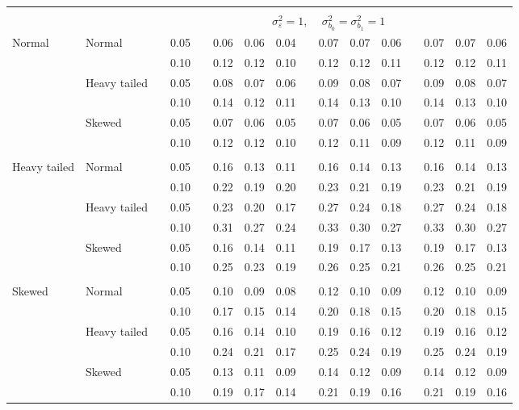\documentclass{article} %
\begin{document}
\begin{table}[ht]
\begin{scriptsize}
\begin{center}
\begin{tabular}{ll p{.1cm} c p{.1cm} rrr p{.1cm} rrr p{.1cm} rrr}
&&&&&&&&&&&&&&&\\
& && && \multicolumn{9}{c}{$\sigma_{\varepsilon}^2 = 1$, \ \ $\sigma_{b_0}^2 = \sigma_{b_1}^2 = 1$} \\ \cline{6-16}
\rowcolor{gray!20}Normal       & Normal       && 0.05 &&   0.06 & 0.06 & 0.04 && 0.07 & 0.07 & 0.06 && 0.07 & 0.07 & 0.06 \\ 
\rowcolor{gray!20}             &              && 0.10 &&   0.12 & 0.12 & 0.10 && 0.12 & 0.12 & 0.11 && 0.12 & 0.12 & 0.11 \\ 
\rowcolor{gray!20}             & Heavy tailed && 0.05 &&   0.08 & 0.07 & 0.06 && 0.09 & 0.08 & 0.07 && 0.09 & 0.08 & 0.07 \\ 
\rowcolor{gray!20}             &              && 0.10 &&   0.14 & 0.12 & 0.11 && 0.14 & 0.13 & 0.10 && 0.14 & 0.13 & 0.10 \\ 
\rowcolor{gray!20}             & Skewed       && 0.05 &&   0.07 & 0.06 & 0.05 && 0.07 & 0.06 & 0.05 && 0.07 & 0.06 & 0.05 \\ 
\rowcolor{gray!20}             &              && 0.10 &&   0.12 & 0.12 & 0.10 && 0.12 & 0.11 & 0.09 && 0.12 & 0.11 & 0.09 \\ 
             &&&&&&&&&&&&&&&\\
Heavy tailed & Normal       && 0.05 &&   0.16 & 0.13 & 0.11 && 0.16 & 0.14 & 0.13 && 0.16 & 0.14 & 0.13 \\ 
             &              && 0.10 &&   0.22 & 0.19 & 0.20 && 0.23 & 0.21 & 0.19 && 0.23 & 0.21 & 0.19 \\ 
             & Heavy tailed && 0.05 &&   0.23 & 0.20 & 0.17 && 0.27 & 0.24 & 0.18 && 0.27 & 0.24 & 0.18 \\ 
             &              && 0.10 &&   0.31 & 0.27 & 0.24 && 0.33 & 0.30 & 0.27 && 0.33 & 0.30 & 0.27 \\ 
             & Skewed       && 0.05 &&   0.16 & 0.14 & 0.11 && 0.19 & 0.17 & 0.13 && 0.19 & 0.17 & 0.13 \\ 
             &              && 0.10 &&   0.25 & 0.23 & 0.19 && 0.26 & 0.25 & 0.21 && 0.26 & 0.25 & 0.21 \\ 
             &&&&&&&&&&&&&&&\\
Skewed       & Normal       && 0.05 &&   0.10 & 0.09 & 0.08 && 0.12 & 0.10 & 0.09 && 0.12 & 0.10 & 0.09 \\ 
             &              && 0.10 &&   0.17 & 0.15 & 0.14 && 0.20 & 0.18 & 0.15 && 0.20 & 0.18 & 0.15 \\ 
             & Heavy tailed && 0.05 &&   0.16 & 0.14 & 0.10 && 0.19 & 0.16 & 0.12 && 0.19 & 0.16 & 0.12 \\ 
             &              && 0.10 &&   0.24 & 0.21 & 0.17 && 0.25 & 0.24 & 0.19 && 0.25 & 0.24 & 0.19 \\ 
             & Skewed       && 0.05 &&   0.13 & 0.11 & 0.09 && 0.14 & 0.12 & 0.09 && 0.14 & 0.12 & 0.09 \\ 
             &              && 0.10 &&   0.19 & 0.17 & 0.14 && 0.21 & 0.19 & 0.16 && 0.21 & 0.19 & 0.16 \\ 



\end{tabular}
\end{center}
\end{scriptsize}
\end{table}
\end{document}
